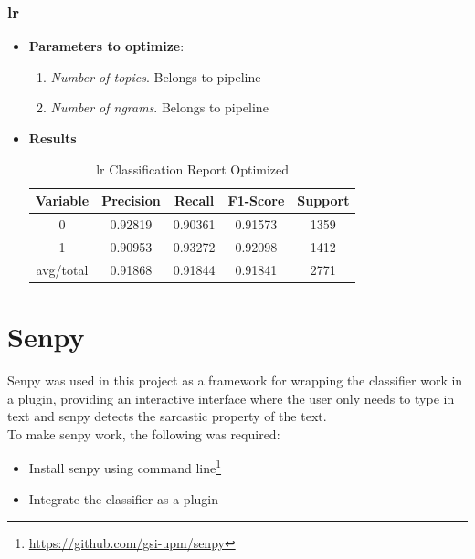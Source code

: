 \subsubsection{\acl{lr}}
\begin{itemize}
	\item \textbf{Parameters to optimize}:
	\begin{enumerate}
		\item \textit{Number of topics}. Belongs to pipeline
		\item \textit{Number of ngrams}. Belongs to pipeline
	\end{enumerate}
	\item \textbf{Results}
	\begin{table}[h!]
		\centering
		\begin{tabular}{||c c c c c||} 
			\hline
			Variable & Precision & Recall & F1-Score & Support \\ [0.5ex] 
			\hline\hline
			0 & 0.92819 & 0.90361 & 0.91573 & 1359 \\ 
			1 & 0.90953 & 0.93272 & 0.92098 & 1412 \\
			avg/total & 0.91868 & 0.91844 & 0.91841 & 2771 \\
			[1ex] 
			\hline
		\end{tabular}
		\caption{\acl{lr} Classification Report Optimized}
		\label{tab:lr2}
	\end{table}
	
\end{itemize}

\section{Senpy}
Senpy was used in this project as a framework for wrapping the classifier work in a plugin, providing an interactive interface where the user only needs to type in text and senpy detects the sarcastic property of the text.\\
To make senpy work, the following was required:
\begin{itemize}
	\item Install senpy using command line\footnote{\url{https://github.com/gsi-upm/senpy}} 
	\item Integrate the classifier as a plugin
\end{itemize}

